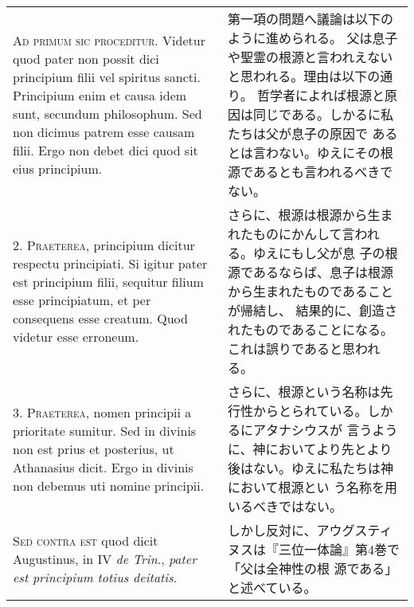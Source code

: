\documentclass[10pt]{jsarticle} %
\begin{document}
\begin{longtable}{p{21em}p{21em}}

{\scshape Ad primum sic proceditur}. Videtur quod pater non possit dici
principium filii vel spiritus sancti. Principium enim et causa idem
sunt, secundum philosophum. Sed non dicimus patrem esse causam
filii. Ergo non debet dici quod sit eius principium.


&

第一項の問題へ議論は以下のように進められる。
父は息子や聖霊の根源と言われえないと思われる。理由は以下の通り。
哲学者によれば根源と原因は同じである。しかるに私たちは父が息子の原因で
 あるとは言わない。ゆえにその根源であるとも言われるべきでない。

\\



2. {\scshape Praeterea}, principium dicitur respectu principiati. Si igitur pater
est principium filii, sequitur filium esse principiatum, et per
consequens esse creatum. Quod videtur esse erroneum.


&

さらに、根源は根源から生まれたものにかんして言われる。ゆえにもし父が息
 子の根源であるならば、息子は根源から生まれたものであることが帰結し、
 結果的に、創造されたものであることになる。これは誤りであると思われる。


\\



3. {\scshape Praeterea}, nomen principii a prioritate sumitur. Sed in divinis non
est prius et posterius, ut Athanasius dicit. Ergo in divinis non
debemus uti nomine principii.


&

さらに、根源という名称は先行性からとられている。しかるにアタナシウスが
 言うように、神においてより先とより後はない。ゆえに私たちは神において根源とい
 う名称を用いるべきではない。

\\



{\scshape Sed contra est} quod dicit Augustinus, in IV {\itshape de Trin}., {\itshape pater est
principium totius deitatis}.


&

しかし反対に、アウグスティヌスは『三位一体論』第4巻で「父は全神性の根
 源である」と述べている。

\\




\end{longtable}
\end{document}
